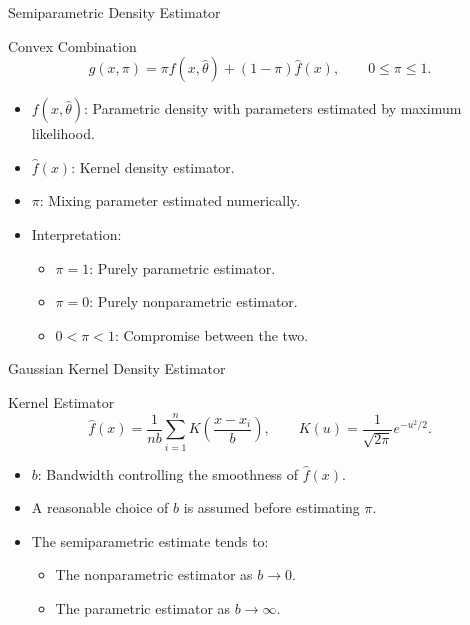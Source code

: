 \begin{frame}{Semiparametric Density Estimator}
\begin{block}{Convex Combination}
\begin{equation}
    g(x,\pi) = \pi f(x,\hat{\theta}) + (1-\pi)\hat{f}(x), 
    \qquad 0 \leq \pi \leq 1.
\end{equation}
\end{block}

\begin{itemize}
    \item $f(x,\hat{\theta})$: Parametric density with parameters estimated by maximum likelihood.
    \item $\hat{f}(x)$: Kernel density estimator.
    \item $\pi$: Mixing parameter estimated numerically.
    \item Interpretation:
    \begin{itemize}
        \item $\pi = 1$: Purely parametric estimator.
        \item $\pi = 0$: Purely nonparametric estimator.
        \item $0 < \pi < 1$: Compromise between the two.
    \end{itemize}
\end{itemize}
\end{frame}

\begin{frame}{Gaussian Kernel Density Estimator}
\begin{block}{Kernel Estimator}
\begin{equation}
    \hat{f}(x) = \frac{1}{n b} \sum_{i=1}^{n} 
    K\!\left(\frac{x - x_i}{b}\right),
    \qquad 
    K(u) = \frac{1}{\sqrt{2\pi}} e^{-u^2/2}.
\end{equation}
\end{block}

\begin{itemize}
    \item $b$: Bandwidth controlling the smoothness of $\hat{f}(x)$.
    \item A reasonable choice of $b$ is assumed before estimating $\pi$.
    \item The semiparametric estimate tends to:
    \begin{itemize}
        \item The nonparametric estimator as $b \to 0$.
        \item The parametric estimator as $b \to \infty$.
    \end{itemize}
\end{itemize}
\end{frame}

